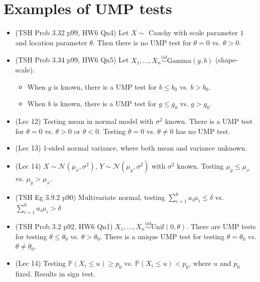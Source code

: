\documentclass[twoside]{article}
\newcommand{\dis}{\displaystyle}
\newcommand\bbP{\mathbb{P}}
\newcommand\calN{\mathcal{N}}
\newcommand\dlt{\delta}
\newcommand\sg{\sigma}
\def\t{\theta}
\begin{document}
\section*{Examples of UMP tests}
\begin{itemize}
\item (TSH Prob 3.32 p99, HW6 Qn4) Let $X \sim$ Cauchy with scale parameter $1$ and location parameter $\t$. Then there is no UMP test for $\t = 0$ vs. $\t > 0$.

\item (TSH Prob 3.34 p99, HW6 Qn5) Let $X_1, \dots, X_n \stackrel{iid}{\sim} \text{Gamma}(g, b)$ (shape-scale).
\begin{itemize}
\item When $g$ is known, there is a UMP test for $b \leq b_0$ vs. $b > b_0$.
\item When $b$ is known, there is a UMP test for $g \leq g_0$ vs. $g > g_0$.
\end{itemize}

\item (Lec 12) Testing mean in normal model with $\sg^2$ known. There is a UMP test for $\t = 0$ vs. $\t > 0$ or $\t < 0$. Testing $\t = 0$ vs. $\t \neq 0$ has no UMP test.

\item (Lec 13) 1-sided normal variance, where both mean and variance unknown.

\item (Lec 14) $X \sim \calN(\mu_x, \sg^2)$, $Y \sim \calN(\mu_y, \sg^2)$ with $\sg^2$ known. Testing $\mu_y \leq \mu_x$ vs. $\mu_y > \mu_x$.

\item (TSH Eg 3.9.2 p90) Multivariate normal, testing $\dis\sum_{i=1}^k a_i \mu_i \leq \dlt$ vs. $\dis\sum_{i=1}^k a_i \mu_i > \dlt$

\item (TSH Prob 3.2 p92, HW6 Qn1) $X_1, \dots, X_n \stackrel{iid}{\sim}\text{Unif}(0, \t)$. There are UMP tests for testing $\t \leq \t_0$ vs. $\t > \t_0$. There is a unique UMP test for testing $\t = \t_0$ vs. $\t \neq \t_0$.

\item (Lec 14) Testing $\bbP(X_i \leq u) \geq p_0$ vs. $\bbP(X_i \leq u) < p_0$, where $u$ and $p_0$ fixed. Results in sign test.
\end{itemize} 
\end{document}
